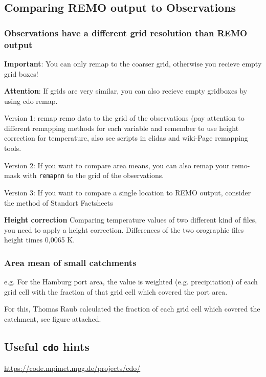 \subsection{Comparing REMO output to Observations}

\subsubsection{Observations have a different grid resolution than REMO output}

\textbf{Important}: You can only remap to the coarser grid, otherwise you recieve empty grid boxes!

\textbf{Attention}: If grids are very similar, you can also recieve empty gridboxes by using cdo remap.

\item Version 1: remap remo data to the grid of the observations (pay attention to different remapping
methods for each variable and remember to use height correction for temperature,
also see scripts in clidas and wiki-Page remapping tools.

\item Version 2: If you want to compare area means, you can also remap your remo-mask with \texttt{remapnn} to the grid of the observations.

\item Version 3: If you want to compare a single location to REMO output, consider the method of Standort Factsheets 

\textbf{Height correction} Comparing temperature values of two different kind of files, you need to apply a height correction. 
Differences of the two orographie files \Delta height times 0,0065 K.

\subsubsection{Area mean of small catchments}

e.g. For the Hamburg port area, the value is weighted (e.g. precipitation) of each grid cell with the fraction of that grid cell which covered the port area. 

For this, Thomas Raub calculated the fraction of each grid cell which covered the catchment, see figure attached. 

\figure

\subsection{Useful \texttt{cdo} hints}
\url{https://code.mpimet.mpg.de/projects/cdo/}

